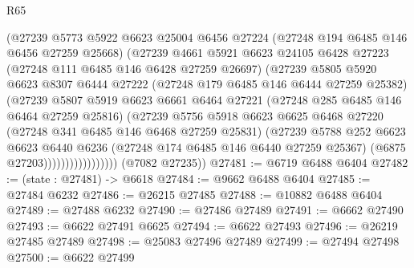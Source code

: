 \begin{lexlean}{R65}
\begin{coremodule}
{                          (@27239
                            @5773
                            @5922
                            @6623
                            @25004
                            @6456
                            @27224
                            (@27248 @194 @6485 @146 @6456 @27259 @25668)
                            (@27239
                              @4661
                              @5921
                              @6623
                              @24105
                              @6428
                              @27223
                              (@27248 @111 @6485 @146 @6428 @27259 @26697)
                              (@27239
                                @5805
                                @5920
                                @6623
                                @8307
                                @6444
                                @27222
                                (@27248 @179 @6485 @146 @6444 @27259 @25382)
                                (@27239
                                  @5807
                                  @5919
                                  @6623
                                  @6661
                                  @6464
                                  @27221
                                  (@27248 @285 @6485 @146 @6464 @27259 @25816)
                                  (@27239
                                    @5756
                                    @5918
                                    @6623
                                    @6625
                                    @6468
                                    @27220
                                    (@27248 @341 @6485 @146 @6468 @27259 @25831)
                                    (@27239
                                      @5788
                                      @252
                                      @6623
                                      @6623
                                      @6440
                                      @6236
                                      (@27248 @174 @6485 @146 @6440 @27259 @25367)
                                      (@6875 @27203)))))))))))))))))
      (@7082 @27235))
@27481 := @6719 @6488 @6404
@27482 := (state : @27481) -> @6618
@27484 := @9662 @6488 @6404
@27485 := @27484 @6232
@27486 := @26215 @27485
@27488 := @10882 @6488 @6404
@27489 := @27488 @6232
@27490 := @27486 @27489
@27491 := @6662 @27490
@27493 := @6622 @27491 @6625
@27494 := @6622 @27493
@27496 := @26219 @27485 @27489
@27498 := @25083 @27496 @27489
@27499 := @27494 @27498
@27500 := @6622 @27499
}
\end{coremodule}
\end{lexlean}

